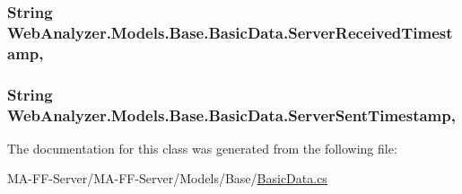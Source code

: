 \subsubsection[{Server\+Received\+Timestamp}]{\setlength{\rightskip}{0pt plus 5cm}String Web\+Analyzer.\+Models.\+Base.\+Basic\+Data.\+Server\+Received\+Timestamp\hspace{0.3cm}{\ttfamily [get]}, {\ttfamily [set]}}\label{class_web_analyzer_1_1_models_1_1_base_1_1_basic_data_ad2317294c8861a75447de02e23886999}
\hypertarget{class_web_analyzer_1_1_models_1_1_base_1_1_basic_data_af2791f5084f56826a6d6987e3a939c94}{}
\subsubsection[{Server\+Sent\+Timestamp}]{\setlength{\rightskip}{0pt plus 5cm}String Web\+Analyzer.\+Models.\+Base.\+Basic\+Data.\+Server\+Sent\+Timestamp\hspace{0.3cm}{\ttfamily [get]}, {\ttfamily [set]}}\label{class_web_analyzer_1_1_models_1_1_base_1_1_basic_data_af2791f5084f56826a6d6987e3a939c94}


The documentation for this class was generated from the following file\+:\begin{DoxyCompactItemize}
\item 
M\+A-\/\+F\+F-\/\+Server/\+M\+A-\/\+F\+F-\/\+Server/\+Models/\+Base/\hyperlink{_basic_data_8cs}{Basic\+Data.\+cs}\end{DoxyCompactItemize}
